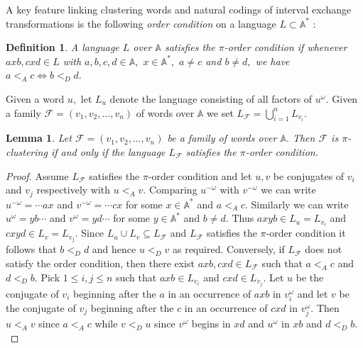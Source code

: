 \documentclass[12pt,a4paper]{amsart}
\newcommand{\A}{{\mathbb A}}
\newtheorem{lemma}{Lemma}
\newtheorem{definition}{Definition}
\begin{document}
 
A key feature linking clustering words  and natural codings of interval exchange transformations is the following  {\it order condition} on a language $L\subset \A^*$ :


\begin{definition} A  language $L$ over $\A$ satisfies the $\pi$-{\it order condition} if whenever $axb, cxd\in L$ with $a,b,c,d \in \A,$  $x\in \A^*,$  $a\neq c$ and $b\neq d,$ we have $a<_A c \Leftrightarrow b<_D d.$ 
\end{definition}


Given a word $u,$ let $L_u$ denote the language consisting of all factors of $u^\omega.$ Given a family   $\mathcal F=(v_1,v_2,\ldots ,v_n)$ of words over $\A$ we set $L_{\mathcal F}=\bigcup _{i=1}^nL_{v_i}.$

\begin{lemma}\label{combine}Let $\mathcal F=(v_1,v_2,\ldots ,v_n)$ be a family of  words over $\A.$    Then $\mathcal F$ is $\pi$-clustering if and only if the  language $L_{\mathcal F}$ satisfies the $\pi$-order condition. 
\end{lemma}

\begin{proof}Assume $L_{\mathcal F}$ satisfies the $\pi$-order condition and let $u,v$ be conjugates of $v_i$ and $v_j$ respectively with $u<_A v.$ Comparing $u^{-\omega}$ with $v^{-\omega}$ we can write $u^{-\omega} =\cdots ax$ and $v^{-\omega}= \cdots cx$ for some $x\in \A^*$ and $a<_A c.$
Similarly we can write $u^\omega=yb\cdots $ and $v^\omega=yd \cdots $ for some $y\in \A^*$ and $b\neq d.$ Thus $axyb\in L_u=L_{v_i}$ and $cxyd\in L_v=L_{v_j}.$ Since  $L_u\cup L_v\subseteq L_{\mathcal F}$ and 
$L_{\mathcal F}$ satisfies the $\pi$-order condition it follows that $b<_D d$ and hence $u<_D v$ as required. 
Conversely, if $L_{\mathcal F}$ does not satisfy the order condition, then there exist $axb,cxd\in L_{\mathcal F}$ such that $a<_A c$ and $d<_D b.$  Pick $1\leq i,j\leq n$ such that   $axb\in L_{v_i}$ and $cxd\in L_{v_j}.$ Let $u$ be the conjugate of $v_i$ beginning after the $a$ in an occurrence of $axb$ in $v_i^\omega$ and let $v$ be the conjugate of $v_j$ beginning after the $c$ in an occurrence of $cxd$ in $v_j^\omega.$   Then $u<_A v$ since $a<_A c$ while  $v<_D u$ since $v^\omega$ begins in $xd$ and $u^\omega$ in $xb$ and $d<_D b.$  \end{proof}
\end{document}

